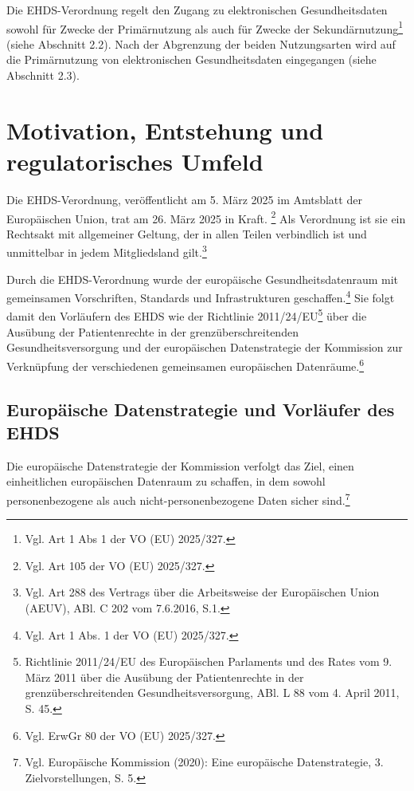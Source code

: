 Die EHDS-Verordnung regelt den Zugang zu elektronischen Gesundheitsdaten sowohl für Zwecke der Primärnutzung als auch für Zwecke der Sekundärnutzung\footnote{Vgl. Art 1 Abs 1 der VO (EU) 2025/327.} (siehe Abschnitt 2.2). Nach der Abgrenzung der beiden Nutzungsarten wird auf die Primärnutzung von elektronischen Gesundheitsdaten eingegangen (siehe Abschnitt 2.3).

\section{Motivation, Entstehung und regulatorisches Umfeld}
Die EHDS-Verordnung, veröffentlicht am 5. März 2025 im Amtsblatt der Europäischen Union, trat am 26. März 2025 in Kraft. \footnote{Vgl. Art 105 der VO (EU) 2025/327.}
Als Verordnung ist sie ein Rechtsakt mit allgemeiner Geltung, der in allen Teilen verbindlich ist und unmittelbar in jedem Mitgliedsland gilt.\footnote{Vgl. Art 288 des Vertrags über die Arbeitsweise der Europäischen Union (AEUV), ABl. C 202 vom 7.6.2016, S.1.}

Durch die EHDS-Verordnung wurde der europäische Gesundheitsdatenraum  mit gemeinsamen Vorschriften, Standards und Infrastrukturen geschaffen.\footnote{Vgl. Art 1 Abs. 1 der VO (EU) 2025/327.}
Sie folgt damit den Vorläufern des EHDS wie der Richtlinie 2011/24/EU\footnote{Richtlinie 2011/24/EU des Europäischen Parlaments und des Rates vom 9. März 2011 über die Ausübung der Patientenrechte in der grenzüberschreitenden Gesundheitsversorgung, ABl. L 88 vom 4. April 2011, S. 45.} über die Ausübung der Patientenrechte in der grenzüberschreitenden Gesundheitsversorgung und der europäischen Datenstrategie der Kommission zur Verknüpfung der verschiedenen gemeinsamen europäischen Datenräume.\footnote{Vgl. ErwGr 80 der VO (EU) 2025/327.}

     \subsection{Europäische Datenstrategie und Vorläufer des EHDS}
Die europäische Datenstrategie der Kommission verfolgt das Ziel, einen einheitlichen europäischen Datenraum zu schaffen, in dem sowohl personenbezogene als auch nicht-personenbezogene Daten sicher sind.\footnote{Vgl. Europäische Kommission (2020): Eine europäische Datenstrategie, 3. Zielvorstellungen, S. 5.}

